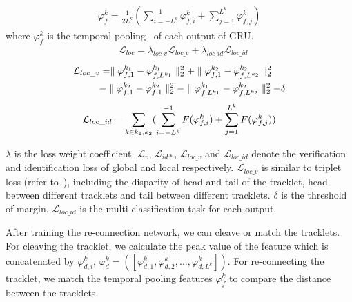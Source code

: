 \documentclass[5pt]{article}
\begin{document}
{\setlength{\abovedisplayskip}{-1mm}
\begin{eqnarray}
\varphi_f^k=\frac{1}{2L^k}(\sum_{i=-L^k}^{-1}\varphi_{f,i}^k+\sum_{j=1}^{L^k}\varphi_{f,j}^k)
\end{eqnarray}}
where $\varphi_f^k$ is the temporal pooling~\cite{mclaughlin2016recurrent} of each output of GRU.
\begin{eqnarray}
&\mathcal{L}_{loc}=\lambda_{loc\_v}\mathcal{L}_{loc\_v}+\lambda_{loc\_id}\mathcal{L}_{loc\_id}
\end{eqnarray}
\begin{eqnarray}
\begin{split}
&\mathcal{L}_{loc\_v}=\parallel\varphi_{f,1}^{k_1}-\varphi_{f,L^{k_1}}^{k_1}\parallel_2^2+\parallel\varphi_{f,1}^{k_2}-\varphi_{f,L^{k_2}}^{k_2}\parallel_2^2\\
&\qquad\ \ -\parallel\varphi_{f,1}^{k_2}-\varphi_{f,1}^{k_2}\parallel_2^2-\parallel\varphi_{f,L^{k_1}}^{k_1}-\varphi_{f,L^{k_2}}^{k_2}\parallel_2^2+\delta
\end{split}
\vspace{-0.2cm}
\end{eqnarray}
\begin{eqnarray}
\begin{split}
\vspace{-0.1cm}
\mathcal{L}_{loc\_id}=\sum_{k\in{k_1,k_2}}(\sum_{i=-L^k}^{-1}F(\varphi_{f,i}^k)+\sum_{j=1}^{L^k}F(\varphi_{f,j}^k))
\end{split}
\end{eqnarray}

\vspace{-0.1cm}
$\lambda$ is the loss weight coefficient. $\mathcal{L}_{v}$, $\mathcal{L}_{id*}$, $\mathcal{L}_{loc\_v}$ and $\mathcal{L}_{loc\_id}$ denote the verification and identification loss of global and local respectively. $\mathcal{L}_{loc\_v}$ is similar to triplet loss (refer to~\cite{son2017multi}), including the disparity of head and tail of the tracklet, head between different tracklets and tail between different tracklets. $\delta$ is the threshold of margin. $\mathcal{L}_{loc\_id}$ is the multi-classification task for each output.

After training the re-connection network, we can cleave or match the tracklets. For cleaving the tracklet, we calculate the peak value of the feature which is concatenated by $\varphi_{d,i}^k$, $\varphi_d^k=([\varphi_{d,1}^k,\varphi_{d,2}^k,...,\varphi_{d,L^k}^k])$. For re-connecting the tracklet, we match the temporal pooling features $\varphi_f^k$ to compare the distance between the tracklets.
\vspace{0.1cm}
\end{document}
